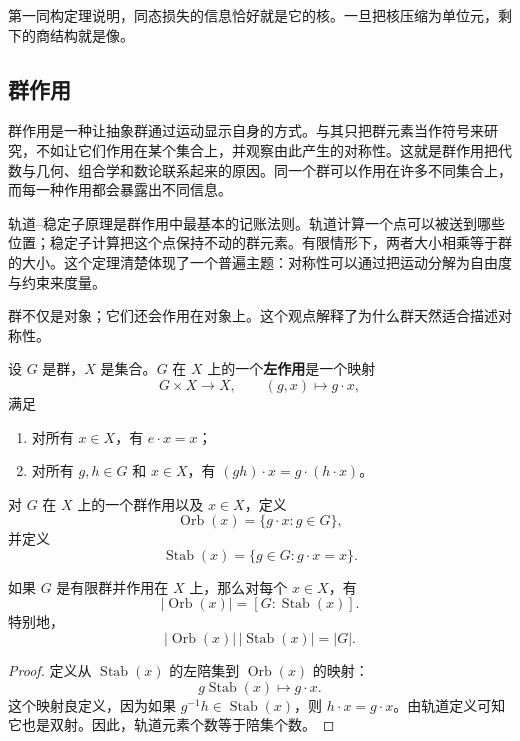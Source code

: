 \begin{remark}
第一同构定理说明，同态损失的信息恰好就是它的核。一旦把核压缩为单位元，剩下的商结构就是像。
\end{remark}

\subsection{群作用}


群作用是一种让抽象群通过运动显示自身的方式。与其只把群元素当作符号来研究，不如让它们作用在某个集合上，并观察由此产生的对称性。这就是群作用把代数与几何、组合学和数论联系起来的原因。同一个群可以作用在许多不同集合上，而每一种作用都会暴露出不同信息。

轨道--稳定子原理是群作用中最基本的记账法则。轨道计算一个点可以被送到哪些位置；稳定子计算把这个点保持不动的群元素。有限情形下，两者大小相乘等于群的大小。这个定理清楚体现了一个普遍主题：对称性可以通过把运动分解为自由度与约束来度量。

群不仅是对象；它们还会作用在对象上。这个观点解释了为什么群天然适合描述对称性。

\begin{definition}[群作用]
设 $G$ 是群，$X$ 是集合。$G$ 在 $X$ 上的一个\textbf{左作用}是一个映射
\[
    G\times X\to X,\qquad (g,x)\mapsto g\cdot x,
\]
满足
\begin{enumerate}
    \item 对所有 $x\in X$，有 $e\cdot x=x$；
    \item 对所有 $g,h\in G$ 和 $x\in X$，有 $(gh)\cdot x=g\cdot(h\cdot x)$。
\end{enumerate}
\end{definition}

\begin{definition}[轨道与稳定子]
对 $G$ 在 $X$ 上的一个群作用以及 $x\in X$，定义
\[
    \operatorname{Orb}(x)=\{g\cdot x:g\in G\},
\]
并定义
\[
    \operatorname{Stab}(x)=\{g\in G:g\cdot x=x\}.
\]
\end{definition}

\begin{theorem}[轨道--稳定子定理]
如果 $G$ 是有限群并作用在 $X$ 上，那么对每个 $x\in X$，有
\[
    |\operatorname{Orb}(x)|=[G:\operatorname{Stab}(x)].
\]
特别地，
\[
    |\operatorname{Orb}(x)|\,|\operatorname{Stab}(x)|=|G|.
\]
\end{theorem}

\begin{proof}
定义从 $\operatorname{Stab}(x)$ 的左陪集到 $\operatorname{Orb}(x)$ 的映射：
\[
    g\operatorname{Stab}(x)\mapsto g\cdot x.
\]
这个映射良定义，因为如果 $g^{-1}h\in\operatorname{Stab}(x)$，则 $h\cdot x=g\cdot x$。由轨道定义可知它也是双射。因此，轨道元素个数等于陪集个数。
\end{proof}

